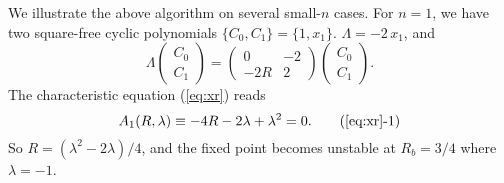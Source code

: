 \documentclass{ws-ijbc}
\begin{document}
We illustrate the above algorithm on several small-$n$ cases.
%
%
%
For $n = 1$, %
we have two square-free cyclic polynomials
$\{C_0, C_1\} = \{1, x_1\}$.
$\Lambda = -2 \, x_1$, and
\[
  \Lambda
  \left( \begin{array}{c}
  C_0 \\
  C_1
  \end{array} \right)
  =
  \left( \begin{array}{cc}
  0     & -2 \\
  -2R   &  2
  \end{array}\right)
  \left( \begin{array}{c}
  C_0 \\
  C_1
  \end{array} \right).
\]
The characteristic equation (\ref{eq:xr}) reads
\begin{equation}
A_1\Rlam
  \equiv -4R - 2\lambda + \lambda^2
  = 0.
  \tag{\ref{eq:xr}-1}
\label{eq:xr1}
\end{equation}
So $R = (\lambda^2 -2\lambda)/4$,
  and the fixed point
  becomes unstable at $R_b = 3/4$ where $\lambda = -1$.
\end{document}
